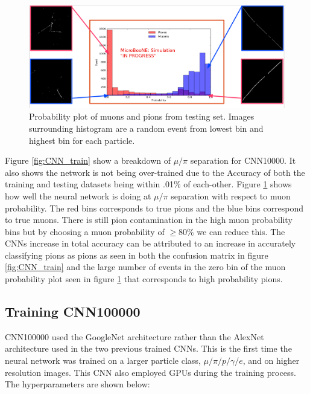 \begin{figure}[htp!]
\includegraphics[width=\textwidth]{figs/mitch_hw.png}
\caption{Probability plot of muons and pions from testing set. Images surrounding histogram are a random event from lowest bin and highest bin for each particle.}
\label{fig:prob_plot}
\end{figure}

Figure \ref{fig:CNN_train} show a breakdown of $\mu/\pi$ separation for CNN10000. It also shows the network is not being over-trained due to the Accuracy of both the training and testing datasets being within .01\% of each-other. Figure \ref{fig:prob_plot} shows how well the neural network is doing at $\mu/\pi$ separation with respect to muon probability. The red bins corresponds to true pions and the blue bins correspond to true muons. There is still pion contamination in the high muon probability bins but by choosing a muon probability of $\geq 80\%$ we can reduce this. The CNNs increase in total accuracy can be attributed to an increase in accurately classifying pions as pions as seen in both the confusion matrix in figure \ref{fig:CNN_train} and the large number of events in the zero bin of the muon probability plot seen in figure \ref{fig:prob_plot} that corresponds to high probability pions.   



\subsection{Training CNN100000}
CNN100000 used the GoogleNet architecture rather than the AlexNet architecture used in the two previous trained CNNs. This is the first time the neural network was trained on a larger particle class, $\mu/\pi/p/\gamma/e$, and on higher resolution images. This CNN also employed GPUs during the training process. The hyperparameters are shown below:

